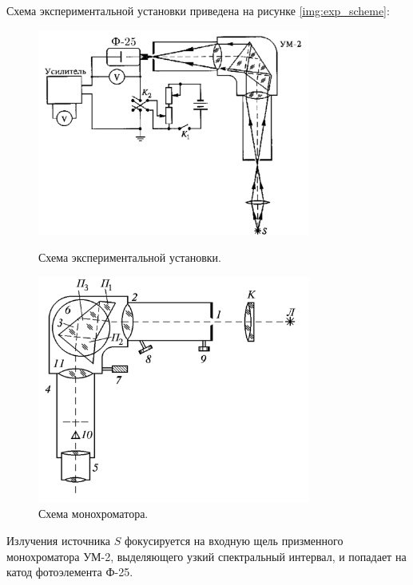 \documentclass[10pt,a4paper]{article}
\begin{document}
	Схема экспериментальной установки приведена на рисунке \ref{img:exp_scheme}:
	\begin{figure}[H]
		\centering
		\begin{minipage}[c]{0.48\textwidth}
			\centering
			\includegraphics[width=0.8\textwidth]{images/exp_scheme.png}
			\caption{Схема экспериментальной установки.}
			\label{img:exp_scheme}
		\end{minipage}
		\hfill
		\begin{minipage}[c]{0.48\textwidth}
			\centering
			\includegraphics[width=0.8\textwidth]{images/exp_scheme2.png}
			\caption{Схема монохроматора.}
			\label{img:exp_scheme2}
		\end{minipage}
	\end{figure}

	Излучения источника $S$ фокусируется на входную щель призменного монохроматора УМ-2, выделяющего узкий спектральный интервал, и попадает на катод фотоэлемента Ф-25.
	
\end{document}
